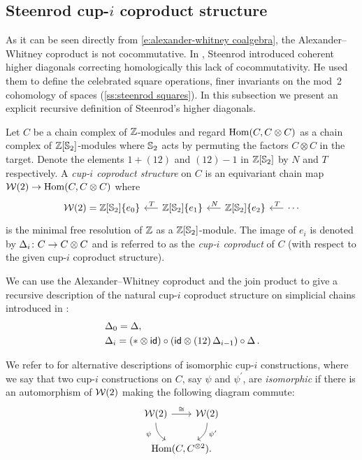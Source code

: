 \subsection{Steenrod cup-$i$ coproduct structure} \label{ss:cup-i}

As it can be seen directly from \eqref{e:alexander-whitney coalgebra}, the Alexander--Whitney coproduct is not cocommutative.
In \cite{steenrod1947products}, Steenrod introduced coherent higher diagonals correcting homologically this lack of cocommutativity.
He used them to define the celebrated square operations, finer invariants on the mod~2 cohomology of spaces (\cref{ss:steenrod squares}).
In this subsection we present an explicit recursive definition of Steenrod's higher diagonals.

Let $C$ be a chain complex of $\mathbb{Z}$-modules and regard $\mathrm{Hom}(C, C \otimes C)$ as a chain complex of $\mathbb{Z}[\mathbb{S}_2]$-modules where $\mathbb{S}_2$ acts by permuting the factors $C \otimes C$ in the target.
Denote the elements $1 + (12)$ and $(12) - 1$ in $\mathbb{Z}[\mathbb{S}_2]$ by $N$ and $T$ respectively.
A \textit{cup-$i$ coproduct structure} on $C$ is an equivariant chain map
$\mathcal{W}(2) \to \mathrm{Hom}(C, C \otimes C)$ where
\begin{equation} \label{e:minimal resolution r=2}
\begin{tikzcd} [column sep = .5cm]
\mathcal W(2) = \Z[\Sym_2]\{e_0\} & \arrow[l, "\,T"'] \Z[\Sym_2]\{e_1\} & \arrow[l, "\,N"'] \Z[\Sym_2]\{e_2\} & \arrow[l, "\,T"'] \cdots
\end{tikzcd}
\end{equation}
is the minimal free resolution of $\mathbb{Z}$ as a $\mathbb{Z}[\mathbb{S}_2]$-module.
The image of $e_i$ is denoted by $\operatorname{\Delta}_i \colon C \to C \otimes C$ and is referred to as the \textit{cup-$i$ coproduct} of $C$ (with respect to the given cup-$i$ coproduct structure).

We can use the Alexander--Whitney coproduct and the join product to give a recursive description of the natural cup-$i$ coproduct structure on simplicial chains introduced in \cite[p.293]{steenrod1947products}:
\begin{equation} \label{e:cup-i coproducts}
\begin{split}
& \operatorname{\Delta}_0 = \operatorname{\Delta}, \\
& \operatorname{\Delta}_i =
(\ast \otimes \mathsf{id}) \circ (\mathsf{id} \otimes (12)\operatorname{\Delta}_{i-1}) \circ \operatorname{\Delta}.
\end{split}
\end{equation}

We refer to \cite{mcclure2003multivariable, gonzalez-diaz1999steenrod, medina2021newformulas} for alternative descriptions of isomorphic \mbox{cup-$i$} constructions, where we say that two \mbox{cup-$i$} constructions on $C$, say $\psi$ and $\psi^\prime$, are \textit{isomorphic} if there is an automorphism of $\mathcal{W}(2)$ making the following diagram commute:
\[
\begin{tikzcd} [column sep = -25, row sep=normal]
\cW(2) \arrow[rr, "\cong"] \arrow[rd, in=150, out=-90, "\psi^{\phantom{\prime}}"', near start] & & \cW(2) \arrow[ld, in=30, out=-90, "\psi^\prime", near start] \\
& \Hom(C, C^{\ot 2}). &
\end{tikzcd}
\]

